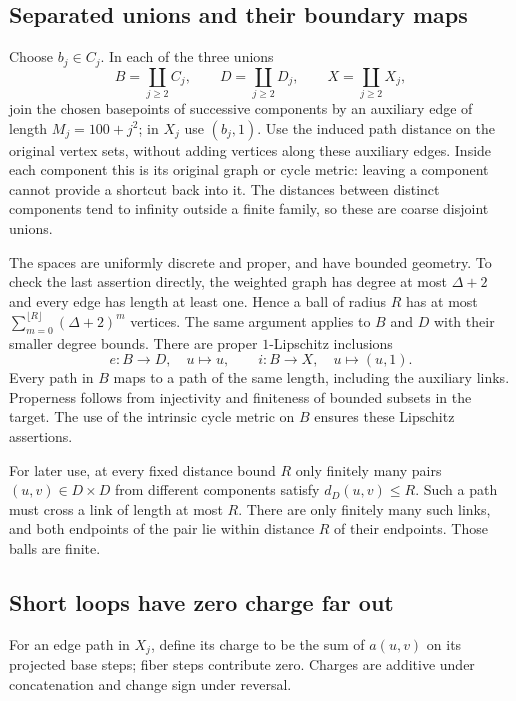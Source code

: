 \subsection{Separated unions and their boundary maps}
Choose $b_j\in C_j$. In each of the three unions
\[
 B=\coprod_{j\ge2}C_j,\qquad D=\coprod_{j\ge2}D_j,\qquad
 X=\coprod_{j\ge2}X_j,
\]
join the chosen basepoints of successive components by an auxiliary edge
of length $M_j=100+j^2$; in $X_j$ use $(b_j,1)$.
Use the induced path distance on the original vertex sets, without adding
vertices along these auxiliary edges. Inside each component this is its
original graph or cycle metric: leaving a component cannot provide a
shortcut back into it. The distances between distinct components tend to
infinity outside a finite family, so these are coarse disjoint unions.

The spaces are uniformly discrete and proper, and have bounded geometry.
To check the last assertion directly, the weighted graph has degree at
most $\Delta+2$ and every edge has length at least one. Hence a ball of
radius $R$ has at most
$\sum_{m=0}^{\lfloor R\rfloor}(\Delta+2)^m$ vertices. The same argument
applies to $B$ and $D$ with their smaller degree bounds. There are proper
$1$-Lipschitz inclusions
\begin{equation}\label{eq:boundarymaps}
 e:B\longrightarrow D,\quad u\longmapsto u,
 \qquad i:B\longrightarrow X,\quad u\longmapsto(u,1).
\end{equation}
Every path in $B$ maps to a path of the same length, including the auxiliary
links. Properness follows from injectivity and finiteness of bounded subsets
in the target. The use of the intrinsic cycle metric on $B$ ensures these
Lipschitz assertions.

For later use, at every fixed distance bound $R$ only finitely many pairs
$(u,v)\in D\times D$ from different components satisfy $d_D(u,v)\le R$.
Such a path must cross a link of length at most $R$. There are only finitely
many such links, and both endpoints of the pair lie within distance $R$
of their endpoints. Those balls are finite.

\subsection{Short loops have zero charge far out}
For an edge path in $X_j$, define its charge to be the sum of $a(u,v)$ on
its projected base steps; fiber steps contribute zero. Charges are additive
under concatenation and change sign under reversal.

